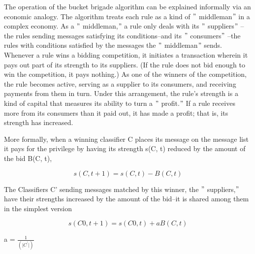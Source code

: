 \documentclass[12pt]{article}
\renewcommand{\_}{\kern-1.5pt\textunderscore\kern-1.5pt}
\begin{document}
The operation of the bucket brigade algorithm can be explained informally via an economic analogy. The algorithm treats each rule as a kind of $"$ middleman$"$  in a complex economy. As a $"$ middleman,$"$  a rule only deals with its $"$ suppliers$"$ –the rules sending messages satisfying its conditions–and its $"$ consumers$"$ –the rules with conditions satisfied by the messages the $"$ middleman$"$  sends. Whenever a rule wins a bidding competition, it initiates a transaction wherein it pays out part of its strength to its suppliers. (If the rule does not bid enough to win the competition, it pays nothing.) As one of the winners of the competition, the rule becomes active, serving as a supplier to its consumers, and receiving payments from them in turn. Under this arrangement, the rule’s strength is a kind of capital that measures its ability to turn a $"$ profit.$"$  If a rule receives more from its consumers than it paid out, it has made a profit; that is, its strength has increased. \par

More formally, when a winning classifier C places its message on the message list it pays for the privilege by having its strength s(C, t) reduced by the amount of the bid B(C, t), \par

 \[ s \left( C, t + 1 \right)  = s \left( C, t \right)  - B \left( C, t \right)  \] \par

The Classifiers C’ sending messages matched by this winner, the $"$ suppliers,$"$  have their strengths increased by the amount of the bid–it is shared among them in the simplest version \par

 \[ s \left( C 0 , t + 1 \right)  = s \left( C 0 , t \right)  + aB \left( C, t \right)  \] \par

a =  \( \frac{1}{ \left(  \vert C^{'} \vert  \right) } \) \par
\end{document}
